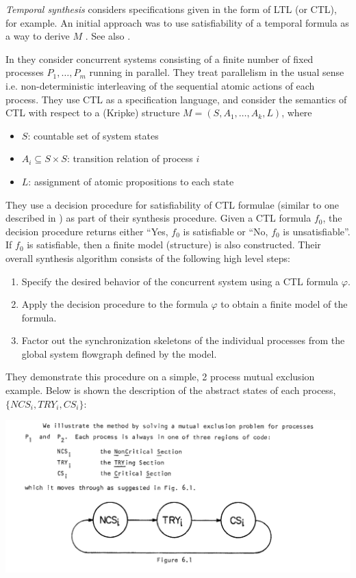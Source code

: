 \documentclass[10pt,a4paper]{article}
\begin{document}
\textit{Temporal synthesis} considers specifications given in the form of LTL (or CTL), for example. An initial approach was to use satisfiability of a temporal formula as a way to derive $M$ \cite{1981clarkemerson}. 
See also \cite{1984mannawolper}. 

In \cite{1981clarkemerson} they consider concurrent systems consisting of a finite number of fixed processes $P_1,\dots,P_m$ running in parallel. They treat parallelism in the usual sense i.e. non-deterministic interleaving of the sequential atomic actions of each process. They use CTL as a specification language, and consider the semantics of CTL with respect to a (Kripke) structure $M=(S,A_1,\dots,A_k,L)$, where
\begin{itemize}
    \item $S$: countable set of system states
    \item $A_i \subseteq S \times S$: transition relation of process $i$
    \item $L$: assignment of atomic propositions to each state
\end{itemize}
They use a decision procedure for satisfiability of CTL formulae (similar to one described in \cite{1981benari}) as part of their synthesis procedure. Given a CTL formula $f_0$, the decision procedure returns either ``Yes, $f_0$ is satisfiable or ``No, $f_0$ is unsatisfiable''. If $f_0$ is satisfiable, then a finite model (structure) is also constructed. Their overall synthesis algorithm consists of the following high level steps:
\begin{enumerate}
    \item Specify the desired behavior of the concurrent system using a CTL formula $\varphi$.
    \item Apply the decision procedure to the formula $\varphi$ to obtain a finite model of the formula.
    \item Factor out the synchronization skeletons of the individual processes from the global system flowgraph defined by the model.
\end{enumerate}
They demonstrate this procedure on a simple, 2 process mutual exclusion example. Below is shown the description of the abstract states of each process, $\{NCS_i, TRY_i, CS_i\}$: 
\begin{center}
    \includegraphics[scale=0.4]{images/mutex_processes.png}
\end{center}
\end{document}
